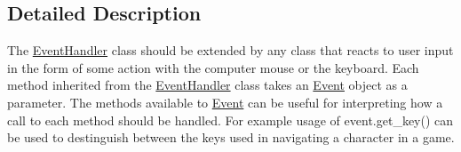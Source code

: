 \subsection{Detailed Description}
The \hyperlink{classcs110graphics_1_1EventHandler}{EventHandler} class should be extended by any class that reacts to user input in the form of some action with the computer mouse or the keyboard. Each method inherited from the \hyperlink{classcs110graphics_1_1EventHandler}{EventHandler} class takes an \hyperlink{classcs110graphics_1_1Event}{Event} object as a parameter. The methods available to \hyperlink{classcs110graphics_1_1Event}{Event} can be useful for interpreting how a call to each method should be handled. For example usage of event.get\_\-key() can be used to destinguish between the keys used in navigating a character in a game.

